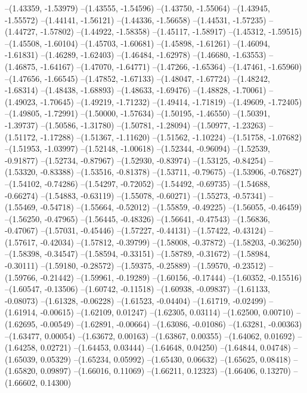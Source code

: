 --(1.43359, -1.53979)
--(1.43555, -1.54596)
--(1.43750, -1.55064)
--(1.43945, -1.55572)
--(1.44141, -1.56121)
--(1.44336, -1.56658)
--(1.44531, -1.57235)
--(1.44727, -1.57802)
--(1.44922, -1.58358)
--(1.45117, -1.58917)
--(1.45312, -1.59515)
--(1.45508, -1.60104)
--(1.45703, -1.60681)
--(1.45898, -1.61261)
--(1.46094, -1.61831)
--(1.46289, -1.62403)
--(1.46484, -1.62978)
--(1.46680, -1.63553)
--(1.46875, -1.64167)
--(1.47070, -1.64771)
--(1.47266, -1.65364)
--(1.47461, -1.65960)
--(1.47656, -1.66545)
--(1.47852, -1.67133)
--(1.48047, -1.67724)
--(1.48242, -1.68314)
--(1.48438, -1.68893)
--(1.48633, -1.69476)
--(1.48828, -1.70061)
--(1.49023, -1.70645)
--(1.49219, -1.71232)
--(1.49414, -1.71819)
--(1.49609, -1.72405)
--(1.49805, -1.72991)
--(1.50000, -1.57634)
--(1.50195, -1.46550)
--(1.50391, -1.39737)
--(1.50586, -1.31780)
--(1.50781, -1.28094)
--(1.50977, -1.23263)
--(1.51172, -1.17288)
--(1.51367, -1.11620)
--(1.51562, -1.10224)
--(1.51758, -1.07682)
--(1.51953, -1.03997)
--(1.52148, -1.00618)
--(1.52344, -0.96094)
--(1.52539, -0.91877)
--(1.52734, -0.87967)
--(1.52930, -0.83974)
--(1.53125, -0.84254)
--(1.53320, -0.83388)
--(1.53516, -0.81378)
--(1.53711, -0.79675)
--(1.53906, -0.76827)
--(1.54102, -0.74286)
--(1.54297, -0.72052)
--(1.54492, -0.69735)
--(1.54688, -0.66274)
--(1.54883, -0.63119)
--(1.55078, -0.60271)
--(1.55273, -0.57341)
--(1.55469, -0.54718)
--(1.55664, -0.52012)
--(1.55859, -0.49225)
--(1.56055, -0.46459)
--(1.56250, -0.47965)
--(1.56445, -0.48326)
--(1.56641, -0.47543)
--(1.56836, -0.47067)
--(1.57031, -0.45446)
--(1.57227, -0.44131)
--(1.57422, -0.43124)
--(1.57617, -0.42034)
--(1.57812, -0.39799)
--(1.58008, -0.37872)
--(1.58203, -0.36250)
--(1.58398, -0.34547)
--(1.58594, -0.33151)
--(1.58789, -0.31672)
--(1.58984, -0.30111)
--(1.59180, -0.28572)
--(1.59375, -0.25889)
--(1.59570, -0.23512)
--(1.59766, -0.21442)
--(1.59961, -0.19289)
--(1.60156, -0.17444)
--(1.60352, -0.15516)
--(1.60547, -0.13506)
--(1.60742, -0.11518)
--(1.60938, -0.09837)
--(1.61133, -0.08073)
--(1.61328, -0.06228)
--(1.61523, -0.04404)
--(1.61719, -0.02499)
--(1.61914, -0.00615)
--(1.62109, 0.01247)
--(1.62305, 0.03114)
--(1.62500, 0.00710)
--(1.62695, -0.00549)
--(1.62891, -0.00664)
--(1.63086, -0.01086)
--(1.63281, -0.00363)
--(1.63477, 0.00054)
--(1.63672, 0.00163)
--(1.63867, 0.00355)
--(1.64062, 0.01692)
--(1.64258, 0.02721)
--(1.64453, 0.03444)
--(1.64648, 0.04250)
--(1.64844, 0.04748)
--(1.65039, 0.05329)
--(1.65234, 0.05992)
--(1.65430, 0.06632)
--(1.65625, 0.08418)
--(1.65820, 0.09897)
--(1.66016, 0.11069)
--(1.66211, 0.12323)
--(1.66406, 0.13270)
--(1.66602, 0.14300)
